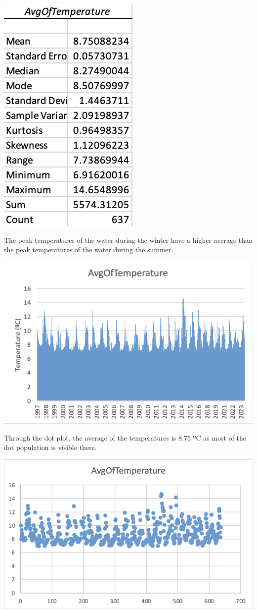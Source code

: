 \documentclass[
  letterpaper,
  DIV=11,
  numbers=noendperiod]{scrreprt}
\begin{document}
\includegraphics{TemperatureStats.png}

The peak temperatures of the water during the winter have a higher
average than the peak temperatures of the water during the summer.

\includegraphics{TemperatureData.png}

Through the dot plot, the average of the temperatures is 8.75 ºC as most
of the dot population is visible there.

\includegraphics{TemperatureAverage.png}
\end{document}
